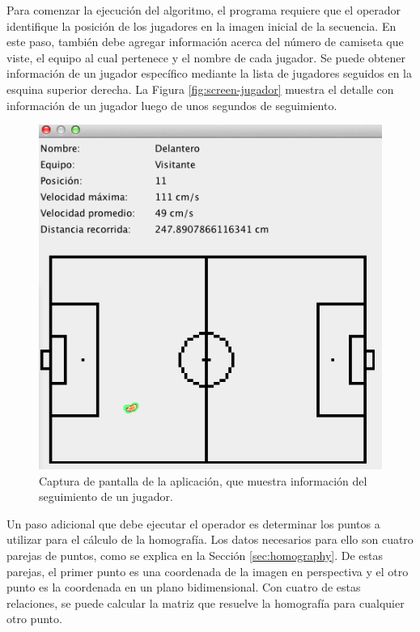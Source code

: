 Para comenzar la ejecución del algoritmo, el programa requiere que el operador
identifique la posición de los jugadores en la imagen inicial de la secuencia.
En este paso, también debe agregar información acerca del número de camiseta
que viste, el equipo al cual pertenece y el nombre de cada jugador. Se puede
obtener información de un jugador específico mediante la lista de jugadores
seguidos en la esquina superior derecha. La Figura \ref{fig:screen-jugador}
muestra el detalle con información de un jugador luego de unos segundos de
seguimiento.

\begin{figure}[H]
  \includegraphics[width=\linewidth]{./images/Screen-Jugador-Stats.png}
  \caption{Captura de pantalla de la aplicación, que muestra información del seguimiento de un jugador.}
  \label{fig:screen1}
\end{figure}

Un paso adicional que debe ejecutar el operador es determinar los puntos a
utilizar para el cálculo de la homografía. Los datos necesarios para ello son
cuatro parejas de puntos, como se explica en la Sección \ref{sec:homography}. De
estas parejas, el primer punto es una coordenada de la imagen en perspectiva y
el otro punto es la coordenada en un plano bidimensional. Con cuatro de estas
relaciones, se puede calcular la matriz que resuelve la homografía para
cualquier otro punto.

